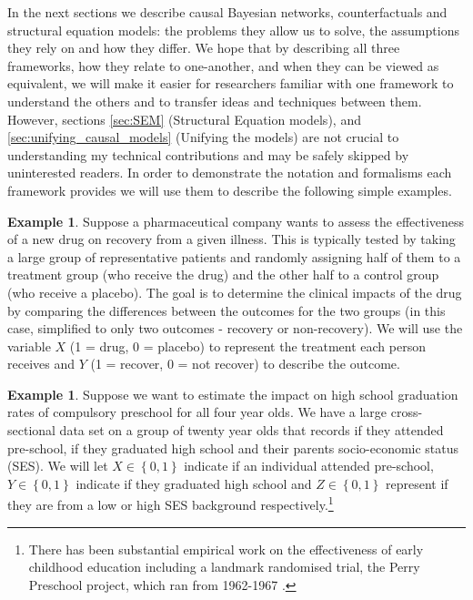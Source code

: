 \documentclass[11pt,a4paper,oneside]{book}
\newcommand{\set}[1]{\left\{#1\right\}}
\theoremstyle{plain}
\theoremstyle{definition}
\newtheorem{example}[theorem]{Example}
\begin{document}
In the next sections we describe causal Bayesian networks, counterfactuals and structural equation models: the problems they allow us to solve, the assumptions they rely on and how they differ. We hope that by describing all three frameworks, how they relate to one-another, and when they can be viewed as equivalent, we will make it easier for researchers familiar with one framework to understand the others and to transfer ideas and techniques between them. However, sections \ref{sec:SEM} (Structural Equation models), and \ref{sec:unifying_causal_models} (Unifying the models) are not crucial to understanding my technical contributions and may be safely skipped by uninterested readers. In order to demonstrate the notation and formalisms each framework provides we will use them to describe the following simple examples. 

\vspace*{.3cm}
\begin{example}
\label{exm:ranomized_experiment}
Suppose a pharmaceutical company wants to assess the effectiveness of a new drug on recovery from a given illness. This is typically tested by taking a large group of representative patients and randomly assigning half of them to a treatment group (who receive the drug) and the other half to a control group (who receive a placebo). The goal is to determine the clinical impacts of the drug by comparing the differences between the outcomes for the two groups (in this case, simplified to only two outcomes - recovery or non-recovery). We will use the variable $X$ (1 = drug, 0 = placebo) to represent the treatment each person receives and $Y$ (1 = recover, 0 = not recover) to describe the outcome. 
\end{example}

\vspace*{.3cm}
\begin{example}
\label{exm:adjusting}
Suppose we want to estimate the impact on high school graduation rates of compulsory preschool for all four year olds. We have a large cross-sectional data set on a group of twenty year olds that records if they attended pre-school, if they graduated high school and their parents socio-economic status (SES). We will let $X\in \set{0,1}$ indicate if an individual attended pre-school, $Y \in \set{0,1}$ indicate if they graduated high school and $Z \in \set{0,1}$ represent if they are from a low or high SES background respectively.\footnote{There has been substantial empirical work on the effectiveness of early childhood education including a landmark randomised trial, the Perry Preschool project, which ran from 1962-1967 \citep{weikart1970longitudinal}.}
\end{example}
\end{document}
